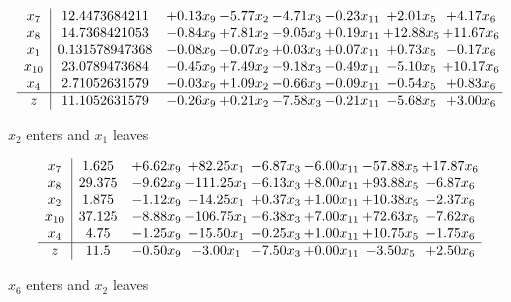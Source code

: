 \documentclass[8pt]{article}
\begin{document}
 \[\begin{array}{c| c c@{\hskip 2pt} c@{\hskip 2pt} c@{\hskip 2pt} c@{\hskip 2pt} c@{\hskip 2pt} c@{\hskip 2pt} }
 x_{7}   &  12.4473684211 & +  0.13 x_{9} & -5.77 x_{2} & -4.71 x_{3} & -0.23 x_{11} & +  2.01 x_{5} & +  4.17 x_{6}\\
 x_{8}   &  14.7368421053 & -0.84 x_{9} & +  7.81 x_{2} & -9.05 x_{3} & +  0.19 x_{11} & + 12.88 x_{5} & + 11.67 x_{6}\\
 x_{1}   &  0.131578947368 & -0.08 x_{9} & -0.07 x_{2} & +  0.03 x_{3} & +  0.07 x_{11} & +  0.73 x_{5} & -0.17 x_{6}\\
 x_{10}   &  23.0789473684 & -0.45 x_{9} & +  7.49 x_{2} & -9.18 x_{3} & -0.49 x_{11} & -5.10 x_{5} & + 10.17 x_{6}\\
 x_{4}   &  2.71052631579 & -0.03 x_{9} & +  1.09 x_{2} & -0.66 x_{3} & -0.09 x_{11} & -0.54 x_{5} & +  0.83 x_{6}\\
\hline
z    &  11.1052631579 & -0.26 x_{9} & +  0.21 x_{2} & -7.58 x_{3} & -0.21 x_{11} & -5.68 x_{5} & +  3.00 x_{6}\\
\end{array}\]


 $ x_{2} $ enters and $ x_{1} $ leaves 

 \[\begin{array}{c| c c@{\hskip 2pt} c@{\hskip 2pt} c@{\hskip 2pt} c@{\hskip 2pt} c@{\hskip 2pt} c@{\hskip 2pt} }
 x_{7}   &  1.625 & +  6.62 x_{9} & + 82.25 x_{1} & -6.87 x_{3} & -6.00 x_{11} & -57.88 x_{5} & + 17.87 x_{6}\\
 x_{8}   &  29.375 & -9.62 x_{9} & -111.25 x_{1} & -6.13 x_{3} & +  8.00 x_{11} & + 93.88 x_{5} & -6.87 x_{6}\\
 x_{2}   &  1.875 & -1.12 x_{9} & -14.25 x_{1} & +  0.37 x_{3} & +  1.00 x_{11} & + 10.38 x_{5} & -2.37 x_{6}\\
 x_{10}   &  37.125 & -8.88 x_{9} & -106.75 x_{1} & -6.38 x_{3} & +  7.00 x_{11} & + 72.63 x_{5} & -7.62 x_{6}\\
 x_{4}   &  4.75 & -1.25 x_{9} & -15.50 x_{1} & -0.25 x_{3} & +  1.00 x_{11} & + 10.75 x_{5} & -1.75 x_{6}\\
\hline
z    &  11.5 & -0.50 x_{9} & -3.00 x_{1} & -7.50 x_{3} & +  0.00 x_{11} & -3.50 x_{5} & +  2.50 x_{6}\\
\end{array}\]


 $ x_{6} $ enters and $ x_{2} $ leaves 
\end{document}

